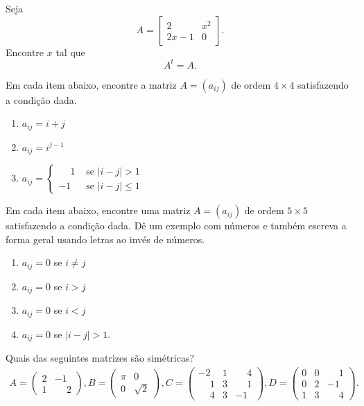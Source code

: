 \documentclass[12pt]{exam}
\begin{document}
\begin{exercicio}
    Seja
    \[
        A = \begin{bmatrix}2 & x^2\\2x - 1 & 0\end{bmatrix}.
    \]
    Encontre $x$ tal que
    \[
        A^t = A.
    \]
\end{exercicio}

\begin{exercicio}
    Em cada item abaixo, encontre a matriz $A = (a_{ij})$ de ordem $4 \times 4$ satisfazendo a condição dada.
    \begin{enumerate}[label={\alph*})]
        \item $a_{ij} = i + j$
        \item $a_{ij} = i^{j - 1}$
        \item $a_{ij} = \begin{cases}\phantom{-} 1 & \mbox{ se } |i - j| > 1\\-1 & \mbox{ se } |i - j| \le 1\end{cases}$
    \end{enumerate}
\end{exercicio}

\begin{exercicio}
    Em cada item abaixo, encontre uma matriz $A = (a_{ij})$ de ordem $5 \times 5$ satisfazendo a condição dada. Dê um exemplo com números e também escreva a forma geral usando letras ao invés de números.
    \begin{enumerate}[label={\alph*})]
        \item $a_{ij} = 0$ se $i \ne j$
        \item $a_{ij} = 0$ se $i > j$
        \item $a_{ij} = 0$ se $i < j$
        \item $a_{ij} = 0$ se $|i - j| > 1$.
    \end{enumerate}
\end{exercicio}

\begin{exercicio}
    Quais das seguintes matrizes são simétricas?
    \begin{align*}
        A = \begin{pmatrix}2 & -1\\1 & \phantom{-} 2\end{pmatrix},
        B = \begin{pmatrix}\pi & 0\\0 & \sqrt{2}\end{pmatrix},
        C = \begin{pmatrix}-2 & 1 & \phantom{-} 4\\\phantom{-} 1 & 3 & \phantom{-} 1\\\phantom{-} 4 & 3 & -1\end{pmatrix},
        D = \begin{pmatrix}0 & 0 & \phantom{-} 1\\0 & 2 & -1\\1 & 3 & \phantom{-} 4\end{pmatrix}.
    \end{align*}
\end{exercicio}
\end{document}
